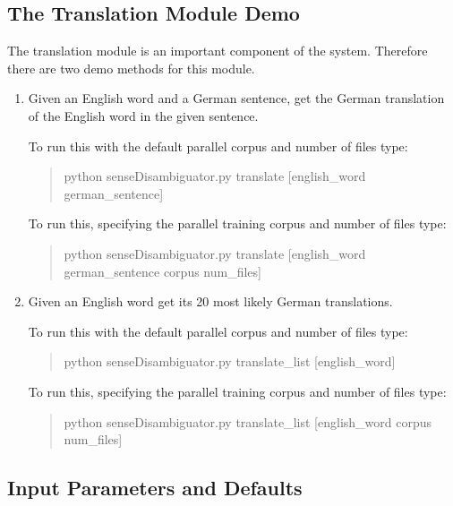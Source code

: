 \documentclass[a4wide,10pt]{article}
\begin{document}
\subsection{The Translation Module Demo}

The translation module is an important component of the system. Therefore
there are two demo methods for this module.

\begin{enumerate}
\item Given an English word and a German sentence, get the German
translation of the English word in the given sentence.

        To run this with the default parallel corpus and number of files type:
\begin{quote}
                python senseDisambiguator.py translate [english\_word
                        german\_sentence]
\end{quote}

        To run this, specifying the parallel training corpus and number
        of files type:
\begin{quote}
                python senseDisambiguator.py translate [english\_word
                        german\_sentence corpus num\_files]
\end{quote}


\item Given an English word get its 20 most likely German translations.

        To run this with the default parallel corpus and number of files type:
\begin{quote}
                python senseDisambiguator.py translate\_list [english\_word]
\end{quote}

        To run this, specifying the parallel training corpus and number
        of files type:
\begin{quote}
                python senseDisambiguator.py translate\_list [english\_word
                        corpus num\_files]
\end{quote}
\end{enumerate}


\subsection{Input Parameters and Defaults}
\end{document}
